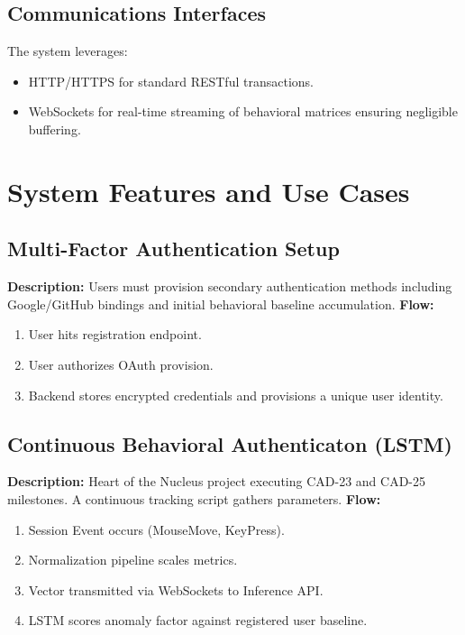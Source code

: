\documentclass[12pt, a4paper]{article}
\begin{document}
\subsection{Communications Interfaces}
The system leverages:
\begin{itemize}
    \item HTTP/HTTPS for standard RESTful transactions.
    \item WebSockets for real-time streaming of behavioral matrices ensuring negligible buffering.
\end{itemize}

\newpage
\section{System Features and Use Cases}

\subsection{Multi-Factor Authentication Setup}
\textbf{Description:} Users must provision secondary authentication methods including Google/GitHub bindings and initial behavioral baseline accumulation.
\newline
\textbf{Flow:}
\begin{enumerate}
    \item User hits registration endpoint.
    \item User authorizes OAuth provision.
    \item Backend stores encrypted credentials and provisions a unique user identity.
\end{enumerate}

\subsection{Continuous Behavioral Authenticaton (LSTM)}
\textbf{Description:} Heart of the Nucleus project executing CAD-23 and CAD-25 milestones. A continuous tracking script gathers parameters.
\newline
\textbf{Flow:}
\begin{enumerate}
    \item Session Event occurs (MouseMove, KeyPress).
    \item Normalization pipeline scales metrics.
    \item Vector transmitted via WebSockets to Inference API.
    \item LSTM scores anomaly factor against registered user baseline.
\end{enumerate}
\end{document}
